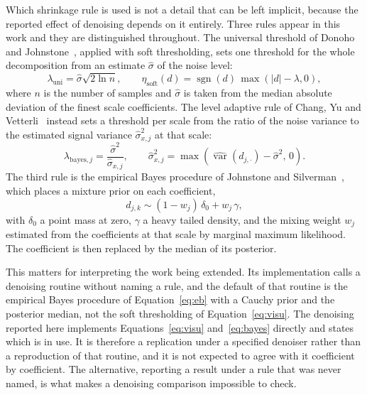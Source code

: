 Which shrinkage rule is used is not a detail that can be left implicit, because the
reported effect of denoising depends on it entirely. Three rules appear in this work and
they are distinguished throughout. The universal threshold of Donoho and
Johnstone~\cite{donoho1994}, applied with soft thresholding, sets one threshold for the
whole decomposition from an estimate $\hat{\sigma}$ of the noise level:
\begin{equation}
\lambda_{\mathrm{uni}} = \hat{\sigma}\sqrt{2\ln n},
\qquad
\eta_{\mathrm{soft}}(d) = \operatorname{sgn}(d)\,\max(|d| - \lambda, 0),
\label{eq:visu}
\end{equation}
where $n$ is the number of samples and $\hat{\sigma}$ is taken from the median absolute
deviation of the finest scale coefficients. The level adaptive rule of Chang, Yu and
Vetterli~\cite{chang2000} instead sets a threshold per scale from the ratio of the noise
variance to the estimated signal variance $\hat{\sigma}_{x,j}^{2}$ at that scale:
\begin{equation}
\lambda_{\mathrm{bayes},j} = \frac{\hat{\sigma}^{2}}{\hat{\sigma}_{x,j}},
\qquad
\hat{\sigma}_{x,j}^{2} = \max\!\left(\widehat{\operatorname{var}}(d_{j,\cdot})
  - \hat{\sigma}^{2},\, 0\right).
\label{eq:bayes}
\end{equation}
The third rule is the empirical Bayes procedure of Johnstone and
Silverman~\cite{johnstone2005}, which places a mixture prior on each coefficient,
\begin{equation}
d_{j,k} \sim (1 - w_j)\,\delta_0 + w_j\,\gamma,
\label{eq:eb}
\end{equation}
with $\delta_0$ a point mass at zero, $\gamma$ a heavy tailed density, and the mixing
weight $w_j$ estimated from the coefficients at that scale by marginal maximum
likelihood. The coefficient is then replaced by the median of its posterior.

This matters for interpreting the work being extended. Its implementation calls a
denoising routine without naming a rule, and the default of that routine is the empirical
Bayes procedure of Equation~\ref{eq:eb} with a Cauchy prior and the posterior median,
not the soft thresholding of Equation~\ref{eq:visu}. The denoising reported here
implements Equations~\ref{eq:visu} and~\ref{eq:bayes} directly and states which is in
use. It is therefore a replication under a specified denoiser rather than a reproduction
of that routine, and it is not expected to agree with it coefficient by coefficient. The
alternative, reporting a result under a rule that was never named, is what makes a
denoising comparison impossible to check.

